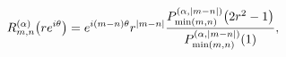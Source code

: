 \[\mathop{R^{(\alpha)}_{m,n}\/}\nolimits\!\left(re^{i\theta}\right)=e^{i(m-n)%
\theta}r^{|m-n|}\frac{\mathop{P^{(\alpha,|m-n|)}_{\min(m,n)}\/}\nolimits\!%
\left(2r^{2}-1\right)}{\mathop{P^{(\alpha,|m-n|)}_{\min(m,n)}\/}\nolimits\!%
\left(1\right)},\]